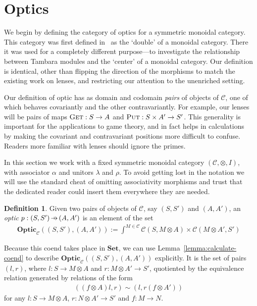 \documentclass[11pt,letterpaper]{article}
\theoremstyle{plain}
\theoremstyle{definition}
\newtheorem{definition}[theorem]{Definition}
\newcommand{\C}{\mathscr{C}}
\newcommand{\Set}{\mathbf{Set}}
\newcommand{\Optic}{\mathbf{Optic}}
\newcommand{\fget}{\textsc{Get}}
\newcommand{\fput}{\textsc{Put}}
\newcommand{\hto}{\ensuremath{\,\mathaccent\shortmid\rightarrow\,}}
\begin{document}
\section{Optics}\label{sec:optics}

We begin by defining the category of optics for a symmetric monoidal category. This category was first defined in~\cite[Section 6]{Doubles} as the `double' of a monoidal category. There it was used for a completely different purpose---to investigate the relationship between Tambara modules and the `center' of a monoidal category. Our definition is identical, other than flipping the direction of the morphisms to match the existing work on lenses, and restricting our attention to the unenriched setting.

Our definition of optic has as domain and codomain \emph{pairs} of objects of $\C$, one of which behaves covariantly and the other contravariantly. For example, our lenses will be pairs of maps $\fget : S \to A$ and $\fput : S \times A' \to S'$. This generality is important for the applications to game theory, and in fact helps in calculations by making the covariant and contravariant positions more difficult to confuse. Readers more familiar with lenses should ignore the primes.

  In this section we work with a fixed symmetric monoidal category $(\C, \otimes, I)$, with associator $\alpha$ and unitors $\lambda$ and $\rho$. To avoid getting lost in the notation we will use the standard cheat of omitting associativity morphisms and trust that the dedicated reader could insert them everywhere they are needed.

\begin{definition}
  Given two pairs of objects of $\C$, say $(S, S')$ and $(A, A')$, an \emph{optic} $p : (S, S') \hto (A, A')$ is an element of the set
  \begin{align*}
    \Optic_\C((S, S'), (A, A')) := \int^{M \in \C} \C(S, M \otimes A) \times \C(M \otimes A', S')
  \end{align*}
\end{definition}

Because this coend takes place in $\Set$, we can use Lemma~\ref{lemma:calculate-coend} to describe $\Optic_\C((S, S'), (A, A'))$ explicitly. It is the set of pairs $(l, r)$, where $l : S \to M \otimes A$ and $r : M \otimes A' \to S'$, quotiented by the equivalence relation generated by relations of the form
\begin{align*}
  ((f \otimes A) l, r) \sim (l, r (f \otimes A'))
\end{align*}
for any $l : S \to M \otimes A$, $r : N \otimes A' \to S'$ and $f : M \to N$.
\end{document}
